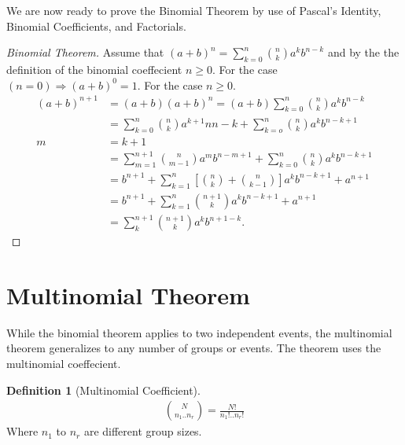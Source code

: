 \documentclass{article}
\theoremstyle{plain}
\theoremstyle{definition}
\newtheorem{definition}{Definition}
\theoremstyle{remark}
\begin{document}
We are now ready to prove the Binomial Theorem by use of Pascal's Identity, Binomial Coefficients, and Factorials.
\begin{proof}[Binomial Theorem]
  Assume that $(a + b)^n = \sum_{k=0}^{n} \binom{n}{k} a^kb^{n-k}$ and by the the definition of the binomial coeffecient $n \geq 0$. For the case $(n = 0) \Rightarrow (a + b)^0 = 1$. For the case $n \ge 0$.
  \begin{align*}
    (a + b)^{n+1} &= (a + b)(a + b)^n = (a+b)\sum_{k=0}^{n}\binom{n}{k}a^kb^{n-k} \\
                  &= \sum^{n}_{k=0}\binom{n}{k}a^{k+1}n{n-k} + \sum^{n}_{k=o}\binom{n}{k}a^{k}b^{n-k+1} \\
    m &= k + 1 \\
                  &= \sum^{n+1}_{m=1}\binom{n}{m-1}a^{m}b^{n-m+1}+\sum^{n}_{k=0}\binom{n}{k}a^{k}b^{n-k+1} \\
                  &= b^{n+1}+\sum^{n}_{k=1}[\binom{n}{k} + \binom{n}{k-1}]a^kb^{n-k+1}+a^{n+1}\\
                  &= b^{n+1}+\sum^{n}_{k=1}\binom{n+1}{k}a^{k}b^{n-k+1}+a^{n+1} \\
                  &= \sum^{n+1}_{k}\binom{n+1}{k}a^{k}b^{n+1-k}.
  \end{align*}
\end{proof}


\section{Multinomial Theorem}
While the binomial theorem applies to two independent events, the multinomial theorem generalizes to any number of groups or events. The theorem uses the multinomial coeffecient.
\begin{definition}[Multinomial Coefficient]
  \begin{align*}
    \binom{N}{n_1..n_r} = \frac{N!}{n_1!..n_r!}
  \end{align*}
  Where $n_1$ to $n_r$ are different group sizes.
\end{definition}
\end{document}
